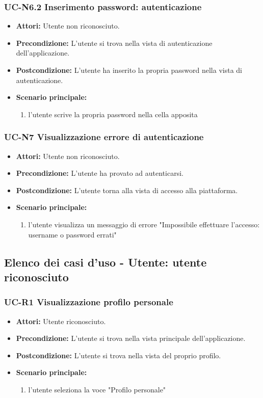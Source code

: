 \subsubsection{UC-N6.2 Inserimento password: autenticazione}
\begin{itemize}
	\item \textbf{Attori:} Utente non riconosciuto.
			\item \textbf{Precondizione:} L'utente si trova nella vista di autenticazione dell'applicazione.
			\item \textbf{Postcondizione:} L'utente ha inserito la propria password nella vista di autenticazione.
			\item \textbf{Scenario principale:}
				\begin{enumerate}
					\item l'utente scrive la propria password nella cella apposita
				\end{enumerate}
\end{itemize}
		
\subsubsection{UC-N7 Visualizzazione errore di autenticazione}
		\begin{itemize}
			\item \textbf{Attori:} Utente non riconosciuto.
			\item \textbf{Precondizione:} L'utente ha provato ad autenticarsi.
			\item \textbf{Postcondizione:} L'utente torna alla vista di accesso alla piattaforma.
			\item \textbf{Scenario principale:}
			\begin{enumerate}
				\item l'utente visualizza un messaggio di errore "Impossibile effettuare l'accesso: username o password errati"
			\end{enumerate}
		\end{itemize}
		
\subsection{Elenco dei casi d'uso - Utente: utente riconosciuto}
\subsubsection{UC-R1 Visualizzazione profilo personale}
\begin{itemize}
	\item \textbf{Attori:} Utente riconosciuto.
	\item \textbf{Precondizione:} L'utente si trova nella vista principale dell'applicazione.
	\item \textbf{Postcondizione:} L'utente si trova nella vista del proprio profilo.
	\item \textbf{Scenario principale:}
		\begin{enumerate}
			\item l'utente seleziona la voce "Profilo personale"
		\end{enumerate}
\end{itemize}


